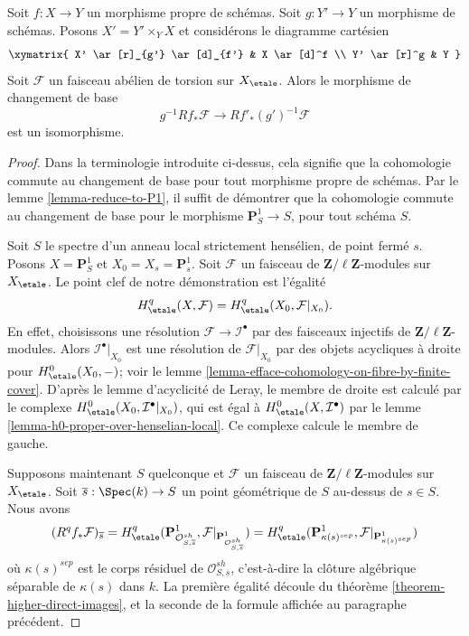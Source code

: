 \begin{theorem}
\label{theorem-proper-base-change}
Soit $f : X \to Y$ un morphisme propre de schémas. Soit $g : Y' \to Y$
un morphisme de schémas. Posons $X' = Y' \times_Y X$
et considérons le diagramme cartésien
$$
\xymatrix{
X' \ar[r]_{g'} \ar[d]_{f'} & X \ar[d]^f \\
Y' \ar[r]^g & Y
}
$$
Soit $\mathcal{F}$ un faisceau abélien de torsion sur $X_\etale$.
Alors le morphisme de changement de base
$$
g^{-1}Rf_*\mathcal{F} \longrightarrow Rf'_*(g')^{-1}\mathcal{F}
$$
est un isomorphisme.
\end{theorem}

\begin{proof}
Dans la terminologie introduite ci-dessus, cela signifie que la cohomologie commute
au changement de base pour tout morphisme propre de schémas. Par le
lemme \ref{lemma-reduce-to-P1},
il suffit de démontrer que la cohomologie commute au changement de base
pour le morphisme $\mathbf{P}^1_S \to S$, pour tout schéma $S$.

\medskip\noindent
Soit $S$ le spectre d'un anneau local strictement hensélien, de point
fermé $s$. Posons $X = \mathbf{P}^1_S$ et $X_0 = X_s = \mathbf{P}^1_s$.
Soit $\mathcal{F}$ un faisceau de $\mathbf{Z}/\ell\mathbf{Z}$-modules
sur $X_\etale$. Le point clef de notre démonstration est l'égalité
$$
H^q_\etale(X, \mathcal{F}) = H^q_\etale(X_0, \mathcal{F}|_{X_0}).
$$
En effet, choisissons une résolution $\mathcal{F} \to \mathcal{I}^\bullet$
par des faisceaux injectifs de $\mathbf{Z}/\ell\mathbf{Z}$-modules.
Alors $\mathcal{I}^\bullet|_{X_0}$ est une résolution de $\mathcal{F}|_{X_0}$
par des objets acycliques à droite pour $H^0_\etale(X_0, -)$; voir le
lemme \ref{lemma-efface-cohomology-on-fibre-by-finite-cover}.
D'après le lemme d'acyclicité de Leray, le membre de droite est calculé par
le complexe $H^0_\etale(X_0, \mathcal{I}^\bullet|_{X_0})$,
qui est égal à $H^0_\etale(X, \mathcal{I}^\bullet)$ par le
lemme \ref{lemma-h0-proper-over-henselian-local}. Ce complexe
calcule le membre de gauche.

\medskip\noindent
Supposons maintenant $S$ quelconque et $\mathcal{F}$ un faisceau de
$\mathbf{Z}/\ell\mathbf{Z}$-modules sur $X_\etale$.
Soit $\overline{s} : \Spec(k) \to S$ un point géométrique
de $S$ au-dessus de $s \in S$. Nous avons
$$
(R^qf_*\mathcal{F})_{\overline{s}} =
H^q_\etale(\mathbf{P}^1_{\mathcal{O}_{S, \overline{s}}^{sh}},
\mathcal{F}|_{\mathbf{P}^1_{\mathcal{O}_{S, \overline{s}}^{sh}}}) =
H^q_\etale(\mathbf{P}^1_{\kappa(s)^{sep}},
\mathcal{F}|_{\mathbf{P}^1_{\kappa(s)^{sep}}})
$$
où $\kappa(s)^{sep}$ est le corps résiduel de
$\mathcal{O}_{S, \overline{s}}^{sh}$, c'est-à-dire la clôture algébrique
séparable de $\kappa(s)$ dans $k$.
La première égalité découle du théorème \ref{theorem-higher-direct-images},
et la seconde de la formule affichée au
paragraphe précédent.


\end{proof}
